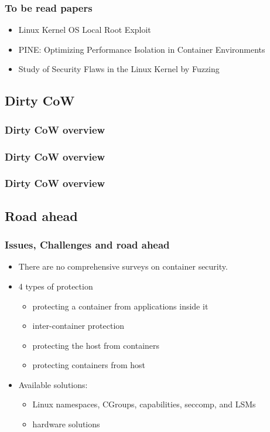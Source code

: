 \documentclass{beamer}
\begin{document}
\begin{frame}
    \frametitle{To be read papers}
    \begin{itemize}
        \item Linux Kernel OS Local Root Exploit\cite{root_exploit}
        \item PINE: Optimizing Performance Isolation in Container Environments\cite{Optimizing}
        \item Study of Security Flaws in the Linux Kernel by Fuzzing\cite{Fuzzing}
    \end{itemize}
\end{frame}

\subsection{Dirty CoW}
\begin{frame}
    \frametitle{Dirty CoW overview}
    
\end{frame}

\begin{frame}
    \frametitle{Dirty CoW overview}
    
\end{frame}

\begin{frame}
    \frametitle{Dirty CoW overview}
    
\end{frame}

\subsection{Road ahead}
\begin{frame}
    \frametitle{Issues, Challenges and road ahead}
    \begin{itemize}
        \item There are no comprehensive surveys on container security.
        \item 4 types of protection
              \begin{itemize}
                  \item protecting a container from applications inside it
                  \item inter-container protection
                  \item protecting the host from containers
                  \item protecting containers from host
              \end{itemize}
        \item Available solutions:
              \begin{itemize}
                  \item Linux namespaces, CGroups, capabilities, seccomp, and LSMs
                  \item hardware solutions
              \end{itemize}
    \end{itemize}
\end{frame}
\end{document}
